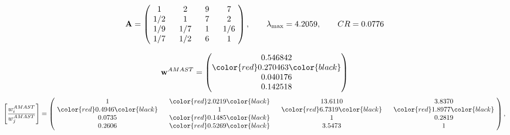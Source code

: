 \begin{example}
\begin{equation*}
\mathbf{A} =
\begin{pmatrix}
$\,\,$ 1 $\,\,$ & $\,\,$2$\,\,$ & $\,\,$9$\,\,$ & $\,\,$7 $\,\,$ \\
$\,\,$ 1/2$\,\,$ & $\,\,$ 1 $\,\,$ & $\,\,$7$\,\,$ & $\,\,$2 $\,\,$ \\
$\,\,$ 1/9$\,\,$ & $\,\,$ 1/7$\,\,$ & $\,\,$ 1 $\,\,$ & $\,\,$ 1/6 $\,\,$ \\
$\,\,$ 1/7$\,\,$ & $\,\,$ 1/2$\,\,$ & $\,\,$6$\,\,$ & $\,\,$ 1  $\,\,$ \\
\end{pmatrix},
\qquad
\lambda_{\max} =
4.2059,
\qquad
CR = 0.0776
\end{equation*}

\begin{equation*}
\mathbf{w}^{AMAST} =
\begin{pmatrix}
0.546842\\
\color{red} 0.270463\color{black} \\
0.040176\\
0.142518
\end{pmatrix}\end{equation*}
\begin{equation*}
\left[ \frac{{w}^{AMAST}_i}{{w}^{AMAST}_j} \right] =
\begin{pmatrix}
$\,\,$ 1 $\,\,$ & $\,\,$\color{red} 2.0219\color{black} $\,\,$ & $\,\,$13.6110$\,\,$ & $\,\,$3.8370$\,\,$ \\
$\,\,$\color{red} 0.4946\color{black} $\,\,$ & $\,\,$ 1 $\,\,$ & $\,\,$\color{red} 6.7319\color{black} $\,\,$ & $\,\,$\color{red} 1.8977\color{black}   $\,\,$ \\
$\,\,$0.0735$\,\,$ & $\,\,$\color{red} 0.1485\color{black} $\,\,$ & $\,\,$ 1 $\,\,$ & $\,\,$0.2819 $\,\,$ \\
$\,\,$0.2606$\,\,$ & $\,\,$\color{red} 0.5269\color{black} $\,\,$ & $\,\,$3.5473$\,\,$ & $\,\,$ 1  $\,\,$ \\
\end{pmatrix},
\end{equation*}


\end{example}
